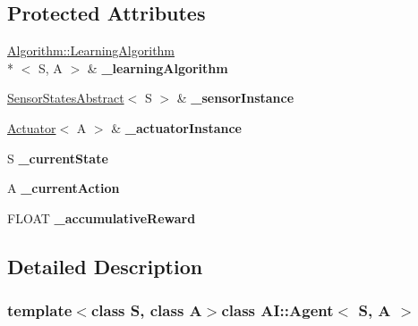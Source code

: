 \subsection*{Protected Attributes}
\begin{DoxyCompactItemize}
\item 
\hypertarget{classAI_1_1Agent_a7ad0d7be90f100fbf20d9134cb4722dc}{\hyperlink{classAI_1_1Algorithm_1_1LearningAlgorithm}{Algorithm\-::\-Learning\-Algorithm}\\*
$<$ S, A $>$ \& {\bfseries \-\_\-learning\-Algorithm}}\label{classAI_1_1Agent_a7ad0d7be90f100fbf20d9134cb4722dc}

\item 
\hypertarget{classAI_1_1Agent_a47f05ad26341cb3dd19790deab83b027}{\hyperlink{classAI_1_1SensorStatesAbstract}{Sensor\-States\-Abstract}$<$ S $>$ \& {\bfseries \-\_\-sensor\-Instance}}\label{classAI_1_1Agent_a47f05ad26341cb3dd19790deab83b027}

\item 
\hypertarget{classAI_1_1Agent_a1a9517c181c1514ffa4f8df2bb68a5dc}{\hyperlink{classAI_1_1Actuator}{Actuator}$<$ A $>$ \& {\bfseries \-\_\-actuator\-Instance}}\label{classAI_1_1Agent_a1a9517c181c1514ffa4f8df2bb68a5dc}

\item 
\hypertarget{classAI_1_1Agent_a3476836f8e24014e2d0e5bd3fcd06c4f}{S {\bfseries \-\_\-current\-State}}\label{classAI_1_1Agent_a3476836f8e24014e2d0e5bd3fcd06c4f}

\item 
\hypertarget{classAI_1_1Agent_a92741f4d9a5324c909e63ab330379411}{A {\bfseries \-\_\-current\-Action}}\label{classAI_1_1Agent_a92741f4d9a5324c909e63ab330379411}

\item 
\hypertarget{classAI_1_1Agent_aa4c5b41816bb39212727186a4af1afec}{F\-L\-O\-A\-T {\bfseries \-\_\-accumulative\-Reward}}\label{classAI_1_1Agent_aa4c5b41816bb39212727186a4af1afec}

\end{DoxyCompactItemize}


\subsection{Detailed Description}
\subsubsection*{template$<$class S, class A$>$class A\-I\-::\-Agent$<$ S, A $>$}

